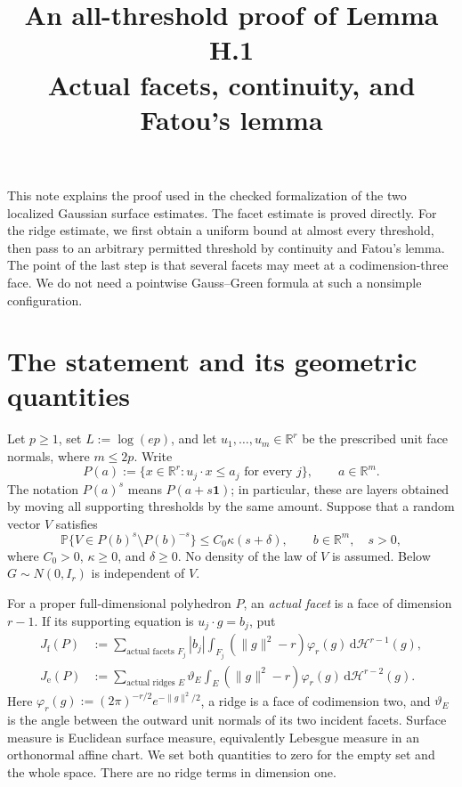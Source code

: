 \documentclass[11pt]{article}
\title{An all-threshold proof of Lemma H.1\\[4pt]
  \large Actual facets, continuity, and Fatou's lemma}
\author{}
\date{}
\newcommand{\R}{\mathbb R}
\newcommand{\PP}{\mathbb P}
\newcommand{\dd}{\,\mathrm d}
\newcommand{\norm}[1]{\lVert #1\rVert}
\newcommand{\Jf}{J_{\mathrm f}}
\newcommand{\Je}{J_{\mathrm e}}
\newcommand{\HH}{\mathcal H}
\begin{document}
\maketitle
\vspace{-1.5em}

This note explains the proof used in the checked formalization of the
two localized Gaussian surface estimates. The facet estimate is proved
directly. For the ridge estimate, we first obtain a uniform bound at
almost every threshold, then pass to an arbitrary permitted threshold
by continuity and Fatou's lemma. The point of the last step is that
several facets may meet at a codimension-three face. We do not need a
pointwise Gauss--Green formula at such a nonsimple configuration.

\section{The statement and its geometric quantities}

Let $p\ge1$, set $L:=\log(ep)$, and let $u_1,\ldots,u_m\in\R^r$ be
the prescribed unit face normals, where $m\le2p$. Write
\[
 P(a):=\{x\in\R^r:u_j\cdot x\le a_j\text{ for every }j\},
 \qquad a\in\R^m.
\]
The notation $P(a)^s$ means $P(a+s\mathbf 1)$; in particular, these
are layers obtained by moving all supporting thresholds by the same
amount. Suppose that a random vector $V$ satisfies
\begin{equation}\label{eq:concentration}
 \PP\{V\in P(b)^s\setminus P(b)^{-s}\}
 \le C_0\kappa(s+\delta),
 \qquad b\in\R^m,\quad s>0,
\end{equation}
where $C_0>0$, $\kappa\ge0$, and $\delta\ge0$. No density of the law
of $V$ is assumed. Below $G\sim N(0,I_r)$ is independent of $V$.

For a proper full-dimensional polyhedron $P$, an \emph{actual facet}
is a face of dimension $r-1$. If its supporting equation is
$u_j\cdot g=b_j$, put
\begin{align}
 \Jf(P)&:=\sum_{\text{actual facets }F_j}|b_j|
       \int_{F_j}(\norm g^2-r)\varphi_r(g)\dd\HH^{r-1}(g),
       \label{eq:Jf}\\
 \Je(P)&:=\sum_{\text{actual ridges }E}\vartheta_E
       \int_E(\norm g^2-r)\varphi_r(g)\dd\HH^{r-2}(g).
       \label{eq:Je}
\end{align}
Here $\varphi_r(g):=(2\pi)^{-r/2}e^{-\norm g^2/2}$, a ridge is a
face of codimension two, and $\vartheta_E$ is the angle between the
outward unit normals of its two incident facets. Surface measure is
Euclidean surface measure, equivalently Lebesgue measure in an
orthonormal affine chart. We set both quantities to zero for the empty
set and the whole space. There are no ridge terms in dimension one.
\end{document}
